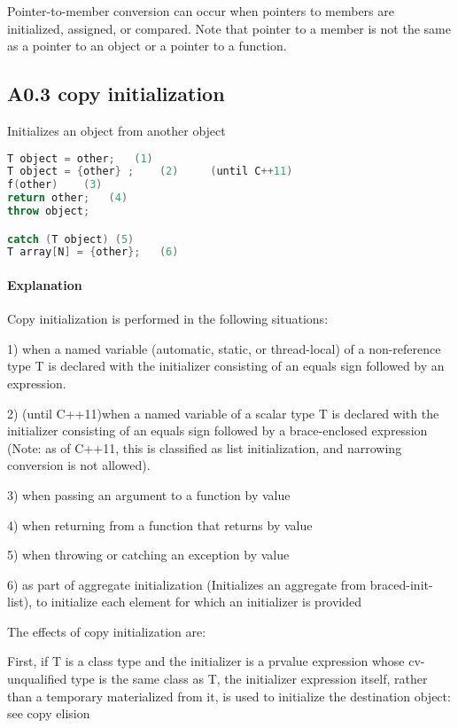 \documentclass{book}
\begin{document}
Pointer-to-member conversion can occur when pointers to members are initialized, assigned, or compared. 
Note that pointer to a member is not the same as a pointer to an object or a pointer to a function.

\subsection{A0.3 copy initialization}
Initializes an object from another object

\begin{lstlisting}[caption={Syntax}, language=C++]
T object = other; 	(1) 	
T object = {other} ; 	(2) 	(until C++11)
f(other) 	(3) 	
return other; 	(4) 	
throw object;

catch (T object) (5) 	
T array[N] = {other}; 	(6) 	
\end{lstlisting}
\paragraph{Explanation}

Copy initialization is performed in the following situations:

1) when a named variable (automatic, static, or thread-local) of a non-reference type T is declared with the initializer consisting of an equals sign followed by an expression.

2) (until C++11)when a named variable of a scalar type T is declared with the initializer consisting of an equals sign followed by a brace-enclosed expression
(Note: as of C++11, this is classified as list initialization, and narrowing conversion is not allowed).

3) when passing an argument to a function by value

4) when returning from a function that returns by value

5) when throwing or catching an exception by value

6) as part of aggregate initialization (Initializes an aggregate from braced-init-list), to initialize each element for which an initializer is provided

The effects of copy initialization are:

        First, if T is a class type and the initializer is a prvalue expression whose cv-unqualified type is the same class as T,
        the initializer expression itself, rather than a temporary materialized from it, is used to initialize the destination object: see copy elision 
\end{document}
